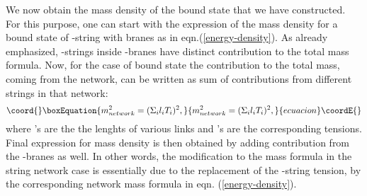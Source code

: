 \documentclass[a4paper,12pt]{article}
\begin{document}
We now obtain the mass density of 
the \coordHE{} bound state 
that we have constructed. For this purpose, one can start with the
expression of the mass density for a bound state of 
\coordHE{}-string with \coordHE{} branes as in eqn.(\ref{energy-density}).
As already emphasized, \coordHE{}-strings inside \coordHE{}-branes have
distinct contribution to the total mass formula. 
Now, for the case of \coordHE{} bound state
the contribution to the total mass, coming from the network, 
can be written as sum of
contributions from different strings in that network\cite{sen}: 
\begin{equation}\coord{}\boxEquation{
m_{network}^2 = (\Sigma_i l_i T_i)^2,
}{
m_{network}^2 = (\Sigma_i l_i T_i)^2,
}{ecuacion}\coordE{}\end{equation}
where \coordHE{}'s are the the lenghts of various links and \coordHE{}'s are 
the corresponding tensions. Final expression for mass density
is then obtained by
adding contribution from the \coordHE{}-branes as well. In other words, 
the modification to the mass formula in the string network case
is essentially due to the replacement of the \coordHE{}-string tension, by 
the corresponding network mass formula in eqn. (\ref{energy-density}).
\end{document}
